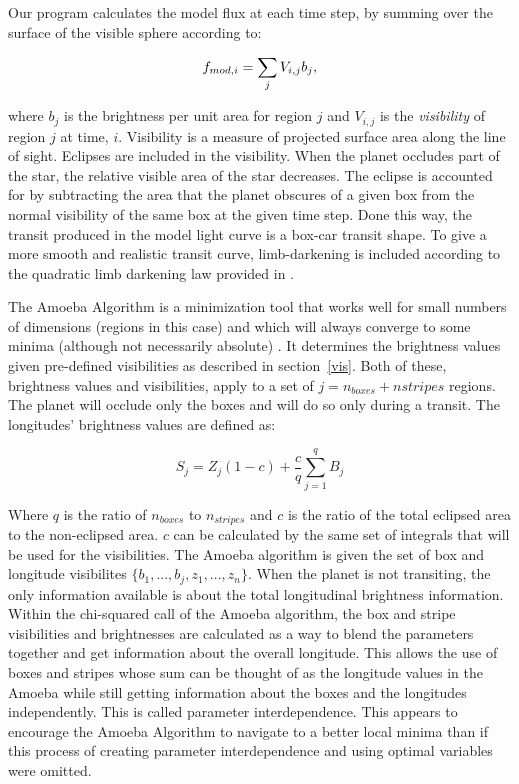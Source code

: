 Our program calculates the model flux at each time step, by summing over the surface of the visible sphere according to:

\begin{equation}
	\mbox{$f_{mod,i}$} = \sum_j V_{i,j}b_j, 
\end{equation}

where $b_j$ is the brightness per unit area for region $j$ and $V_{i,j}$ is the {\it visibility} of region $j$ at time, $i$. Visibility is a measure of projected surface area along the line of sight. Eclipses are included in the visibility. When the planet occludes part of the star, the relative visible area of the star decreases. The eclipse is accounted for by subtracting the area that the planet obscures of a given box from the normal visibility of the same box at the given time step. Done this way, the transit produced in the model light curve is a box-car transit shape. To give a more smooth and realistic transit curve, limb-darkening is included according to the quadratic limb darkening law provided in \citep{Claret2004}.

The Amoeba Algorithm is a minimization tool that works well for small numbers of dimensions (regions in this case) and which will always converge to some minima (although not necessarily absolute) \citep{NR}. It determines the brightness values given pre-defined visibilities as described in section~\ref{vis}. Both of these, brightness values and visibilities, apply to a set of $j = n_{boxes} + n{stripes}$ regions. The planet will occlude only the boxes and will do so only during a transit. The longitudes' brightness values are defined as:

\begin{equation}
S_j = Z_j (1 - c) + \frac{c}{q} \sum_{j=1}^{q}B_j
\label{z_val}
\end{equation}

Where $q$ is the ratio of $n_{boxes}$ to $n_{stripes}$ and $c$ is the ratio of the total eclipsed area to the non-eclipsed area. $c$ can be calculated by the same set of integrals that will be used for the visibilities. The Amoeba algorithm is given the set of box and longitude visibilites $\{b_1, ..., b_j, z_1, ..., z_n\}$. When the planet is not transiting, the only information available is about the total longitudinal brightness information. Within the chi-squared call of the Amoeba algorithm, the box and stripe visibilities and brightnesses are calculated as a way to blend the parameters together and get information about the overall longitude. This allows the use of boxes and stripes whose sum can be thought of as the longitude values in the Amoeba while still getting information about the boxes and the longitudes independently. This is called parameter interdependence. This appears to encourage the Amoeba Algorithm to navigate to a better local minima than if this process of creating parameter interdependence and using optimal variables were omitted. 


